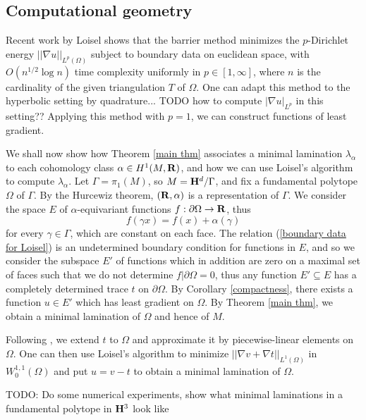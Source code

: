 
\subsection{Computational geometry}
Recent work by Loisel \cite{Loisel20} shows that the barrier method minimizes the $p$-Dirichlet energy $||\nabla u||_{L^p(\Omega)}$
subject to boundary data on euclidean space, with $O(n^{1/2} \log n)$ time complexity uniformly in $p \in [1, \infty]$, where $n$ is the cardinality of the given triangulation $T$ of $\Omega$.
One can adapt this method to the hyperbolic setting by quadrature... TODO how to compute $|\nabla u|_{L^p}$ in this setting??
Applying this method with $p = 1$, we can construct functions of least gradient.

We shall now show how Theorem \ref{main thm} associates a minimal lamination $\lambda_\alpha$ to each cohomology class $\alpha \in H^1(M, \mathbf{R})$, and how we can use Loisel's algorithm to compute $\lambda_\alpha$.
Let $\Gamma = \pi_1(M)$, so $M = \mathbf H^d/\Gamma$, and fix a fundamental polytope $\Omega$ of $\Gamma$.
By the Hurcewiz theorem, $(\mathbf{R}, \alpha)$ is a representation of $\Gamma$.
We consider the space $E$ of $\alpha$-equivariant functions $f: \partial \Omega \to \mathbf{R}$, thus
\begin{equation}\label{boundary data for Loisel}
f(\gamma x) = f(x) + \alpha(\gamma)
\end{equation}
for every $\gamma \in \Gamma$, which are constant on each face.
The relation (\ref{boundary data for Loisel}) is an undetermined boundary condition for functions in $E$, and so we consider the subspace $E'$ of functions which in addition are zero on a maximal set of faces such that we do not determine $f|\partial \Omega = 0$, thus any function $E' \subseteq E$ has a completely determined trace $t$ on $\partial \Omega$.
By Corollary \ref{compactness}, there exists a function $u \in E'$ which has least gradient on $\Omega$.
By Theorem \ref{main thm}, we obtain a minimal lamination of $\Omega$ and hence of $M$.

Following \cite[\S4]{Loisel20}, we extend $t$ to $\Omega$ and approximate it by piecewise-linear elements on $\Omega$.
One can then use Loisel's algorithm to minimize $||\nabla v + \nabla t||_{L^1(\Omega)}$ in $W^{1, 1}_0(\Omega)$ and put $u = v - t$ to obtain a minimal lamination of $\Omega$.

TODO: Do some numerical experiments, show what minimal laminations in a fundamental polytope in $\mathbf H^3$ look like
